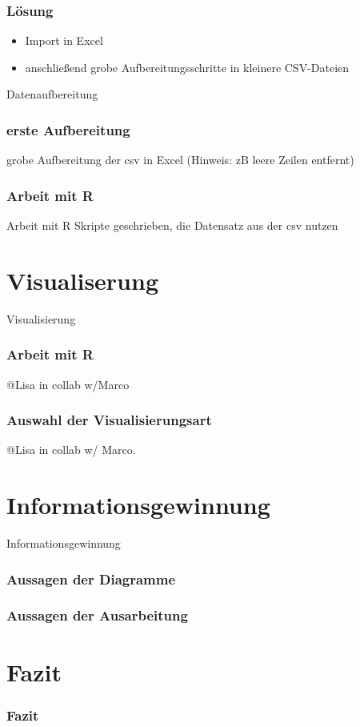 \documentclass{beamer}
\begin{document}
\begin{frame}
	\frametitle{Lösung}
	\begin{itemize}
		\item Import in Excel
		\item anschließend grobe Aufbereitungsschritte in kleinere CSV-Dateien
	\end{itemize}
\end{frame}

\begin{frame}
	\begin{center}
		{\Huge Datenaufbereitung}
	\end{center}
\end{frame}

\begin{frame}
	\frametitle{erste Aufbereitung}
	grobe Aufbereitung der csv in Excel (Hinweis: zB leere Zeilen entfernt)
\end{frame}
\begin{frame}
	\frametitle{Arbeit mit R}
	Arbeit mit R
	Skripte geschrieben, die Datensatz aus der csv nutzen
\end{frame}

\section{Visualiserung}
\begin{frame}
	\begin{center}
		{\Huge Visualisierung}
	\end{center}
\end{frame}

\begin{frame}
	\frametitle{Arbeit mit R}
	@Lisa in collab w/Marco
\end{frame}

\begin{frame}
	\frametitle{Auswahl der Visualisierungsart}
	@Lisa in collab w/ Marco.
\end{frame}

\section{Informationsgewinnung}
\begin{frame}
	\begin{center}
		{\Huge Informationsgewinnung}
	\end{center}
\end{frame}

\begin{frame}
	\frametitle{Aussagen der Diagramme}
\end{frame}

\begin{frame}
	\frametitle{Aussagen der Ausarbeitung}
\end{frame}

\section{Fazit}
\begin{frame}
	\frametitle{Fazit}
\end{frame}

\end{document}
